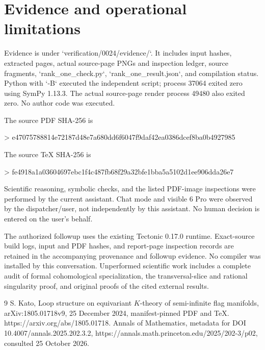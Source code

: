 \documentclass[10pt]{article}
\begin{document}
\section*{Evidence and operational limitations}
Evidence is under `verification/0024/evidence/`. It includes input hashes, extracted pages, actual source-page PNGs and inspection ledger, source fragments, `rank\_one\_check.py`, `rank\_one\_result.json`, and compilation status. Python with `-B` executed the independent script; process 37064 exited zero using SymPy 1.13.3. The actual source-page render process 49480 also exited zero. No author code was executed.\par
The source PDF SHA-256 is\par
> e47075788814e72187d48e7a680dd6f6047f9daf42ea0386dcef8ba0b4927985\par
The source TeX SHA-256 is\par
> fe4918a1a03604697ebc1f4c487fb68f29a32bfe1bba5a5102d1ee906dda26e7\par
Scientific reasoning, symbolic checks, and the listed PDF-image inspections were performed by the current assistant. Chat mode and visible 6 Pro were observed by the dispatcher/user, not independently by this assistant. No human decision is entered on the user’s behalf.\par
The authorized followup uses the existing Tectonic 0.17.0 runtime. Exact-source build logs, input and PDF hashes, and report-page inspection records are retained in the accompanying provenance and followup evidence. No compiler was installed by this conversation. Unperformed scientific work includes a complete audit of formal cohomological specialization, the transversal-slice and rational singularity proof, and original proofs of the cited external results.\par
9 S. Kato, Loop structure on equivariant \(K\)-theory of semi-infinite flag manifolds, arXiv:1805.01718v9, 25 December 2024, manifest-pinned PDF and TeX. https://arxiv.org/abs/1805.01718. Annals of Mathematics, metadata for DOI 10.4007/annals.2025.202.3.2, https://annals.math.princeton.edu/2025/202-3/p02, consulted 25 October 2026.\par
\end{document}
